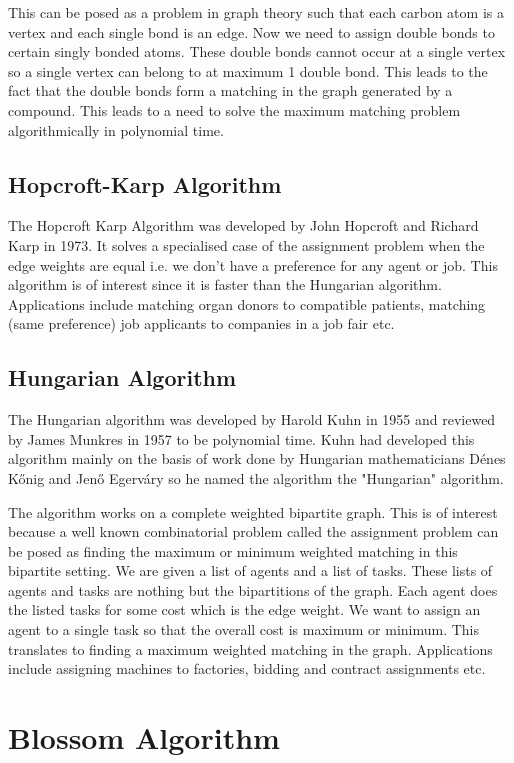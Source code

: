 \documentclass[oneside]{book}
\begin{document}
This can be posed as a problem in graph theory such that each carbon atom is a vertex and each single bond is an edge. Now we need to assign double bonds to certain singly bonded atoms. These double bonds cannot occur at a single vertex so a single vertex can belong to at maximum 1 double bond. This leads to the fact that the double bonds form a matching in the graph generated by a compound. This leads to a need to solve the maximum matching problem algorithmically in polynomial time.

\section{Hopcroft-Karp Algorithm}
The Hopcroft Karp Algorithm was developed by John Hopcroft and Richard Karp in 1973. It solves a specialised case of the assignment problem when the edge weights are equal i.e. we don't have a preference for any agent or job. This algorithm is of interest since it is faster than the Hungarian algorithm. Applications include matching organ donors to compatible patients, matching (same preference) job applicants to companies in a job fair etc.


\section{Hungarian Algorithm}
The Hungarian algorithm was developed by Harold Kuhn in 1955 and reviewed by James Munkres in 1957 to be polynomial time. Kuhn had developed this algorithm mainly on the basis of work done by Hungarian mathematicians Dénes Kőnig and Jenő Egerváry so he named the algorithm the "Hungarian" algorithm.

The algorithm works on a complete weighted bipartite graph. This is of interest because a well known combinatorial problem called the assignment problem can be posed as finding the maximum or minimum weighted matching in this bipartite setting. We are given a list of agents and a list of tasks. These lists of agents and tasks are nothing but the bipartitions of the graph. Each agent does the listed tasks for some cost which is the edge weight. We want to assign an agent to a single task so that the overall cost is maximum or minimum. This translates to finding a maximum weighted matching in the graph. Applications include assigning machines to factories, bidding and contract assignments etc.

\chapter{Blossom Algorithm}

\end{document}
